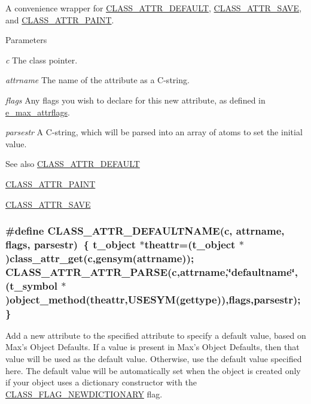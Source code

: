 A convenience wrapper for \hyperlink{group__attr_ga91196b43f49d6769e6fe2df99f5c7c77}{CLASS\_\-ATTR\_\-DEFAULT}, \hyperlink{group__attr_gaf56dc31d0defad3cdc1ee60b611acc79}{CLASS\_\-ATTR\_\-SAVE}, and \hyperlink{group__attr_gaee847156d2c156b4c9f73652b6059500}{CLASS\_\-ATTR\_\-PAINT}. 
\begin{DoxyParams}{Parameters}
\item[{\em c}]The class pointer. \item[{\em attrname}]The name of the attribute as a C-\/string. \item[{\em flags}]Any flags you wish to declare for this new attribute, as defined in \hyperlink{group__attr_gaf296cfc6741bb19207f6ed8062809115}{e\_\-max\_\-attrflags}. \item[{\em parsestr}]A C-\/string, which will be parsed into an array of atoms to set the initial value. \end{DoxyParams}
\begin{DoxySeeAlso}{See also}
\hyperlink{group__attr_ga91196b43f49d6769e6fe2df99f5c7c77}{CLASS\_\-ATTR\_\-DEFAULT} 

\hyperlink{group__attr_gaee847156d2c156b4c9f73652b6059500}{CLASS\_\-ATTR\_\-PAINT} 

\hyperlink{group__attr_gaf56dc31d0defad3cdc1ee60b611acc79}{CLASS\_\-ATTR\_\-SAVE} 
\end{DoxySeeAlso}
\hypertarget{group__attr_gaf6ee00a905a84d18172a212667cfa4cb}{
\subsubsection[{CLASS\_\-ATTR\_\-DEFAULTNAME}]{\setlength{\rightskip}{0pt plus 5cm}\#define CLASS\_\-ATTR\_\-DEFAULTNAME(c, \/  attrname, \/  flags, \/  parsestr)~\{ {\bf t\_\-object} $\ast$theattr=({\bf t\_\-object} $\ast$)class\_\-attr\_\-get(c,gensym(attrname)); CLASS\_\-ATTR\_\-ATTR\_\-PARSE(c,attrname,\char`\"{}defaultname\char`\"{},(t\_\-symbol $\ast$)object\_\-method(theattr,USESYM(gettype)),flags,parsestr); \}}}
\label{group__attr_gaf6ee00a905a84d18172a212667cfa4cb}


Add a new attribute to the specified attribute to specify a default value, based on Max's Object Defaults. If a value is present in Max's Object Defaults, then that value will be used as the default value. Otherwise, use the default value specified here. The default value will be automatically set when the object is created only if your object uses a dictionary constructor with the \hyperlink{group__class_gga124a08e1744d9e999211abaa9df9f556aab2bebd8a64110247fa11db1c13ca5eb}{CLASS\_\-FLAG\_\-NEWDICTIONARY} flag.


